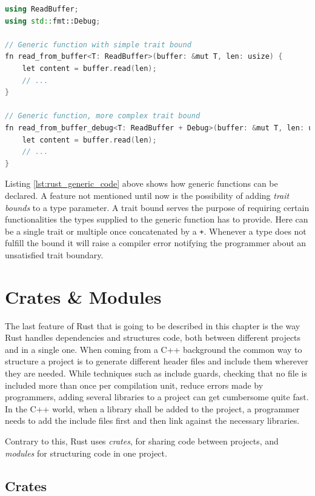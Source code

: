 \begin{lstlisting}[caption={A generic function in Rust showcasing trait bounds}, label={lst:rust_generic_code}, language=C++]
using ReadBuffer;
using std::fmt::Debug;

// Generic function with simple trait bound
fn read_from_buffer<T: ReadBuffer>(buffer: &mut T, len: usize) {
	let content = buffer.read(len);
	// ...
}

// Generic function, more complex trait bound
fn read_from_buffer_debug<T: ReadBuffer + Debug>(buffer: &mut T, len: usize) {
	let content = buffer.read(len);
	// ...
}
\end{lstlisting}

\noindent
Listing \ref{lst:rust_generic_code} above shows how generic functions can be declared. A feature not mentioned until now is the possibility of adding \textit{trait bounds} to a type parameter. A trait bound serves the purpose of requiring certain functionalities the types supplied to the generic function has to provide. Here can be a single trait or multiple once concatenated by a \texttt{+}. Whenever a type does not fulfill the bound it will raise a compiler error notifying the programmer about an unsatisfied trait boundary.

\section{Crates \& Modules}

The last feature of Rust that is going to be described in this chapter is the way Rust handles dependencies and structures code, both between different projects and in a single one. When coming from a C++ background the common way to structure a project is to generate different header files and include them wherever they are needed. While techniques such as include guards, checking that no file is included more than once per compilation unit, reduce errors made by programmers, adding several libraries to a project can get cumbersome quite fast. In the C++ world, when a library shall be added to the project, a programmer needs to add the include files first and then link against the necessary libraries. 

Contrary to this, Rust uses \textit{crates}, for sharing code between projects, and \textit{modules} for structuring code in one project. 

\subsection{Crates}

